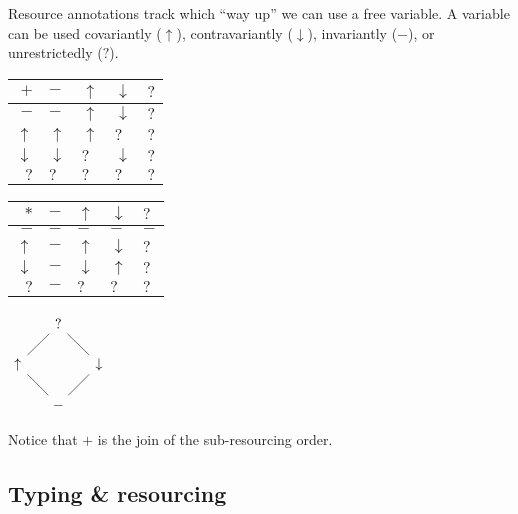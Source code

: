 \begin{example}[Monotonicity]
  Resource annotations track which ``way up'' we can use a free variable.
  A variable can be used covariantly ($\uparrow$), contravariantly
  ($\downarrow$), invariantly ($-$), or unrestrictedly ($?$).

  \begin{center}
  \begin{tabular}{>{$}r<{$}|>{$}l<{$}>{$}l<{$}>{$}l<{$}>{$}l<{$}}
    +          & -          & \uparrow & \downarrow & ? \\
    \hline
    -          & -          & \uparrow & \downarrow & ? \\
    \uparrow   & \uparrow   & \uparrow & ?          & ? \\
    \downarrow & \downarrow & ?        & \downarrow & ? \\
    ?          & ?          & ?        & ?          & ? \\
  \end{tabular}%
  \hspace{0.5in}%
  \begin{tabular}{>{$}r<{$}|>{$}l<{$}>{$}l<{$}>{$}l<{$}>{$}l<{$}}
    *          & - & \uparrow   & \downarrow & ? \\
    \hline
    -          & - & -          & -          & - \\
    \uparrow   & - & \uparrow   & \downarrow & ? \\
    \downarrow & - & \downarrow & \uparrow   & ? \\
    ?          & - & ?          & ?          & ? \\
  \end{tabular}%
  \hspace{0.5in}%
  \(
    \begin{tikzcd}[arrows=dash,row sep=0.5cm,column sep=0.5cm]
      & ? & \\
      \uparrow \arrow[ur] && \downarrow \arrow[ul] \\
      & - \arrow[ul]\arrow[ur] &
    \end{tikzcd}
  \)
  \end{center}

  Notice that $+$ is the join of the sub-resourcing order.
\end{example}

\subsection{Typing \& resourcing}

